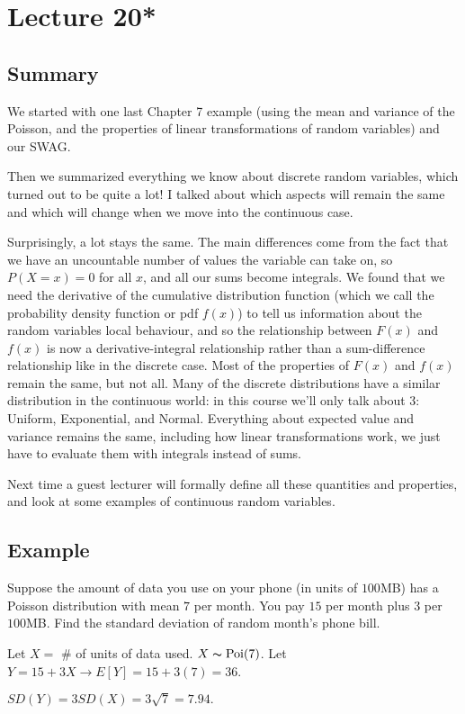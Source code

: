 \section{Lecture 20*}
\subsection{Summary}
We started with one last Chapter 7 example (using the mean and variance of the Poisson, and the properties of linear transformations of random variables) and our SWAG.

Then we summarized everything we know about discrete random variables, which turned out to be quite a lot! I talked about which aspects will remain the same and which will change when we move into the continuous case.

Surprisingly, a lot stays the same. The main differences come from the fact that we have an uncountable number of values the variable can take on, so $P(X=x) = 0$ for all $x$, and all our sums become integrals. We found that we need the derivative of the cumulative distribution function (which we call the probability density function or pdf $f(x)$) to tell us information about the random variables local behaviour, and so the relationship between $F(x)$ and $f(x)$ is now a derivative-integral relationship rather than a sum-difference relationship like in the discrete case. Most of the properties of $F(x)$ and $f(x)$ remain the same, but not all. Many of the discrete distributions have a similar distribution in the continuous world: in this course we'll only talk about 3: Uniform, Exponential, and Normal. Everything about expected value and variance remains the same, including how linear transformations work, we just have to evaluate them with integrals instead of sums.

Next time a guest lecturer will formally define all these quantities and properties, and look at some examples of continuous random variables.

\subsection{Example}
Suppose the amount of data you use on your phone (in units of $ 100 $MB) has
a Poisson distribution with mean $ 7 $ per month. You pay $ 15 $ per
month plus $ 3 $ per $ 100 $MB. Find the standard deviation of random
month's phone bill.

Let $ X= $ \# of units of data used. $ X \thicksim \operatorname{Poi}(7) $. Let
$ Y=15+3X\rightarrow E[Y]=15+3(7)=36 $. 

$ SD(Y)=3SD(X)=3\sqrt{7}=7.94. $